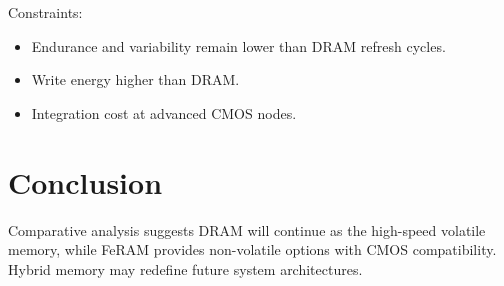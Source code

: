 \documentclass[journal]{IEEEtran}
\begin{document}
Constraints:
\begin{itemize}
\item Endurance and variability remain lower than DRAM refresh cycles.
\item Write energy higher than DRAM.
\item Integration cost at advanced CMOS nodes.
\end{itemize}

\section{Conclusion}
Comparative analysis suggests DRAM will continue as the high-speed volatile 
memory, while FeRAM provides non-volatile options with CMOS compatibility. 
Hybrid memory may redefine future system architectures.



\end{document}

